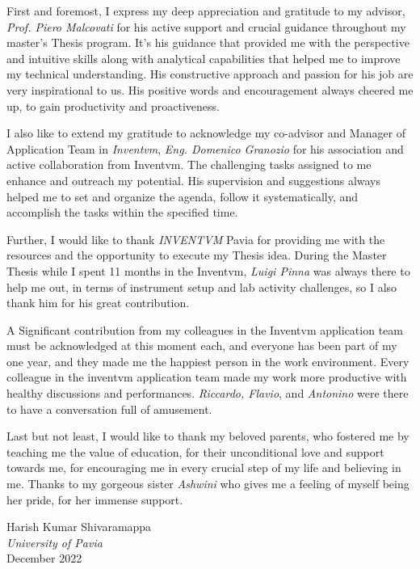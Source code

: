 \thispagestyle{empty} 

\noindent First and foremost, I express my deep appreciation and gratitude to my advisor,
\textit{Prof. Piero Malcovati} for his active support and crucial guidance throughout my master's Thesis program. It’s his guidance that provided me with the perspective and intuitive skills along with analytical capabilities that helped me to improve my technical
understanding. His constructive approach and passion for his job are very inspirational to us. His positive words and encouragement always cheered me up, to gain productivity and proactiveness.

I also like to extend my gratitude to acknowledge my co-advisor and Manager of Application Team in \textit{Inventvm}, \textit{Eng. Domenico Granozio} for his association and active collaboration from Inventvm. The challenging tasks assigned to me enhance and outreach my potential. His supervision and
suggestions always helped me to set and organize the agenda, follow it systematically, and accomplish the tasks within the specified time.


Further, I would like to thank \textit{INVENTVM} Pavia for providing me with the resources and the opportunity to execute my Thesis idea. During the Master Thesis while I spent 11 months in the Inventvm, \textit{Luigi Pinna} was always there to help me out, in terms of instrument setup and lab activity challenges, so I also thank him for his great contribution.

A Significant contribution from my colleagues in the Inventvm application team must be acknowledged at this moment each, and everyone has been part of my one year, and they made me the happiest person in the work environment. Every colleague in the inventvm application team made my work more productive with healthy discussions and performances. \textit{Riccardo, Flavio}, and \textit{Antonino} were there to have a conversation full of amusement.

Last but not least, I would like to thank my beloved parents, who fostered me by teaching me the value of education, for their unconditional love and support towards me, for encouraging me in every crucial step of my life and believing in me. Thanks to my gorgeous sister \textit{Ashwini} who gives me a feeling of myself being her pride, for her immense support.

\begin{flushright}
    Harish Kumar Shivaramappa\\
    \textit{University of Pavia}\\
    December 2022
\end{flushright}


